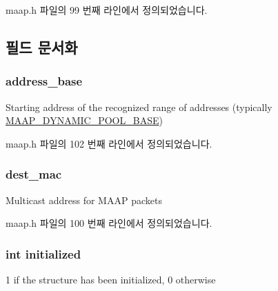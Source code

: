 maap.\+h 파일의 99 번째 라인에서 정의되었습니다.



\subsection{필드 문서화}
\subsubsection[{\texorpdfstring{address\+\_\+base}{address_base}}]{ address\+\_\+base}\hypertarget{struct_maap___client_a35767d757d073fc43d0f1118d5cbdc4e}{}\label{struct_maap___client_a35767d757d073fc43d0f1118d5cbdc4e}
Starting address of the recognized range of addresses (typically \hyperlink{openavb__endpoint__osal__maap_8c_ae6263079f02d6fcdb18350e93b5e8fd9}{M\+A\+A\+P\+\_\+\+D\+Y\+N\+A\+M\+I\+C\+\_\+\+P\+O\+O\+L\+\_\+\+B\+A\+SE}) 

maap.\+h 파일의 102 번째 라인에서 정의되었습니다.

\subsubsection[{\texorpdfstring{dest\+\_\+mac}{dest_mac}}]{ dest\+\_\+mac}\hypertarget{struct_maap___client_a205a8c33627111589223916ef80462c2}{}\label{struct_maap___client_a205a8c33627111589223916ef80462c2}
Multicast address for M\+A\+AP packets 

maap.\+h 파일의 100 번째 라인에서 정의되었습니다.

\subsubsection[{\texorpdfstring{initialized}{initialized}}]{\setlength{\rightskip}{0pt plus 5cm}int initialized}\hypertarget{struct_maap___client_ad06983e7f6e71b233ea7ff3dee1952f2}{}\label{struct_maap___client_ad06983e7f6e71b233ea7ff3dee1952f2}
1 if the structure has been initialized, 0 otherwise 

